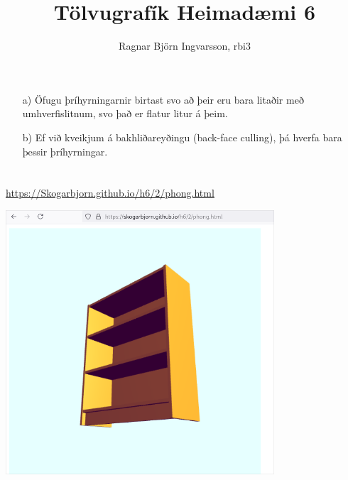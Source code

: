 \documentclass{article}
\title{Tölvugrafík Heimadæmi 6 }
\author{Ragnar Björn Ingvarsson, rbi3}
\begin{document}
\renewcommand\thepage{}

	\maketitle

	\newpage
	\setcounter{page}{1}
	\renewcommand\thepage{\arabic{page}}

	\section{}
	\begin{itemize}
		\item[a)] Öfugu þríhyrningarnir birtast svo að þeir eru bara litaðir 
			með umhverfislitnum, svo það er flatur litur á þeim.
		\item[b)] Ef við kveikjum á bakhliðareyðingu (back-face culling), 
			þá hverfa bara þessir þríhyrningar.
	\end{itemize}

	\section{}
	\url{https://Skogarbjorn.github.io/h6/2/phong.html}
	\begin{center}
		\includegraphics[width=0.75\textwidth]{billy.png}
	\end{center}

	\newpage
\end{document}
